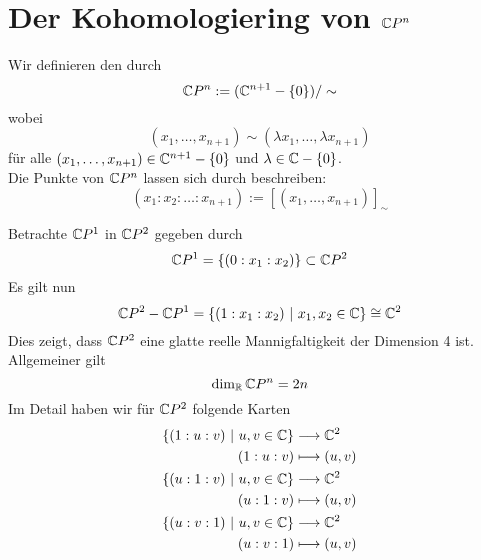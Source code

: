 \section{Der Kohomologiering von $\mathbb{C} P^n$}
\Def{}
Wir definieren den  durch
\[ \mathbb{C} P^n := (\mathbb{C}^{n+1} - \{0\})/\sim \]
wobei
\[ (x_1,\ldots, x_{n+1}) \sim (\lambda x_1,\ldots, \lambda x_{n+1}) \]
für alle $(x_1,\ldots, x_{n+1}) \in \mathbb{C}^{n+1} - \{0\}$ und $\lambda \in \mathbb{C} - \{0\}$.\\
Die Punkte von $\mathbb{C} P^n$ lassen sich durch  beschreiben:
\[ (x_1 : x_2 : \ldots : x_{n+1}) := [ (x_1,\ldots, x_{n+1}) ]_\sim \]

\Bsp{}
Betrachte $\mathbb{C} P^1$ in $\mathbb{C} P^2$ gegeben durch
\[ \C P^1 = \set{ (0: x_1 : x_2) }{} \subset \C P^2 \]
Es gilt nun
\[ \C P^2 - \C P^1 = \set{(1 : x_1 : x_2)}{x_1, x_2 \in \C} \isom{} \C^2 \]
Dies zeigt, dass $\mathbb{C} P^2$ eine glatte reelle Mannigfaltigkeit der Dimension 4 ist. Allgemeiner gilt
\[ \dim_{\mathbb{R}} \mathbb{C} P^n = 2n \]
Im Detail haben wir für $\mathbb{C} P^2$ folgende Karten
\begin{align*}
\{(1 : u : v)~|~u,v \in \mathbb{C}\} & \overset{}{\longrightarrow} \mathbb{C}^2\\
(1 : u : v) & \longmapsto (u,v)\\
\{(u : 1 : v)~|~u,v \in \mathbb{C}\} & \overset{}{\longrightarrow} \mathbb{C}^2\\
(u : 1 : v) & \longmapsto (u,v)\\
\{(u : v : 1)~|~u,v \in \mathbb{C}\} & \overset{}{\longrightarrow} \mathbb{C}^2\\
( u : v : 1 ) & \longmapsto (u,v)\\
\end{align*}

